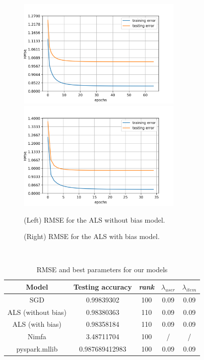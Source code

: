 \documentclass[a4paper]{article}
\begin{document}
\mbox{}\\

\begin{figure}[h]
  \centering
  \includegraphics[width=8cm]{RMSE_ALS.png}
  \includegraphics[width=8cm]{RMSE_ALS_BIAS.png}
  \label{fig:figure 3}
  \caption{(Left) RMSE for the ALS without bias model.}
  \label{fig:figure 4}
  \caption{(Right) RMSE for the ALS with bias model.}
\end{figure}

\mbox{}\\

\begin{table}[h!]
  \centering
  \begin{tabular}{|c|c|c|c|c|}
    \hline
    \textbf{Model} & \textbf{Testing accuracy} & \textbf{\textit{rank}} & \boldmath\(\lambda_{user}\)& \boldmath\(\lambda_{item}\)\\
    \hline
    SGD & 0.99839302 & 100 & 0.09 & 0.09\\
    \hline
    ALS (without bias) & 0.98380363 & 110 & 0.09 & 0.09\\
    \hline
    ALS (with bias) & 0.98358184 & 110 & 0.09 & 0.09\\
    \hline
    Nimfa & 3.48711704 & 100 & / & / \\
    \hline
    pyspark.mllib & 0.987689412983 & 100 & 0.09 & 0.09\\
    \hline
  \end{tabular}
  \caption{RMSE and best parameters for our models}
  \label{tab:table 1}
\end{table}
\mbox{}\\
\end{document}
